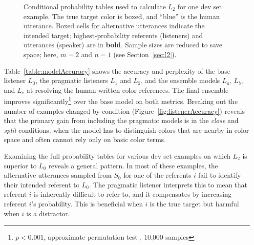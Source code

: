 \documentclass[11pt,letterpaper]{article}
\newcommand{\Listener}{L}
\newcommand{\Speaker}{S}
\renewcommand{\|}{\mid}
\newcommand{\best}[1]{\textbf{#1}}
\newcommand{\secref}[1]{Section~\ref{#1}}
\newcommand{\figref}[1]{Figure~\ref{#1}}
\newcommand{\Tabref}[1]{Table~\ref{#1}}
\newcommand{\colorPatch}[2][xxxx]{
  \colorbox[HTML]{#2}{{\color[HTML]{#2}#1}}}
\newcommand{\colorContext}[4]{
  \framebox{\negthickspace\colorPatch{#1}} & \colorPatch{#2} & \colorPatch{#3} & #4}
\newcommand{\cond}{\emph}
\begin{document}
\begin{figure}[t!]
\begin{tabular}{lr@{\hskip 5pt}r@{\hskip 5pt}r@{}r}
\end{tabular}
\caption{Conditional probability tables used to calculate $\Listener_2$
for one dev set example. The true target color is boxed, and ``blue'' is
the human utterance. Boxed cells for alternative
utterances indicate the intended target; highest-probability referents
(listeners) and utterances (speaker) are in \textbf{bold}.
Sample sizes are reduced to save space; here,
$m = 2$ and $n = 1$ (see \secref{sec:l2}).}
\label{fig:rsaExample}
\end{figure}

\Tabref{table:modelAccuracy} shows the accuracy
and perplexity of the base listener $\Listener_0$, the pragmatic listeners
$\Listener_1$ and $\Listener_2$, and the ensemble models $\Listener_a$,
$\Listener_b$, and $\Listener_e$ at resolving the human-written color
references. The
final ensemble improves significantly\footnote{$p <{}$0.001, approximate
permutation test \cite{Pado2006}, 10,000 samples} over the base model on both metrics.
Breaking out the number of examples changed by condition
(\figref{fig:listenerAccuracy}) reveals that
the primary gain from including the pragmatic models is in the
\cond{close} and \cond{split} conditions, when the
model has to distinguish colors that are nearby in color space and
often cannot rely only on basic color terms.

Examining the full probability tables for various dev set examples on which
$\Listener_2$ is superior to $\Listener_0$ reveals a general pattern. In most
of these examples, the alternative utterances sampled from $\Speaker_0$ for one
of the referents $i$ fail to identify
their intended referent to $\Listener_0$. The pragmatic listener interprets
this to mean that referent $i$ is inherently difficult to refer to,
and it compensates by increasing referent $i$'s probability. This is beneficial
when $i$ is the true target but harmful when $i$ is a distractor.
\end{document}
